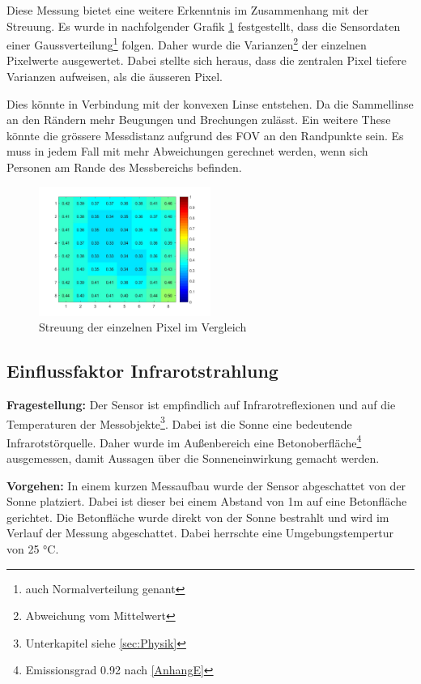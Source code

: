 Diese Messung bietet eine weitere Erkenntnis im Zusammenhang mit der Streuung. Es wurde in nachfolgender Grafik \ref{fig:Streuung} festgestellt, dass die Sensordaten einer Gaussverteilung\footnote[13]{auch Normalverteilung genant} folgen. Daher wurde die Varianzen\footnote[14]{Abweichung vom Mittelwert} der einzelnen Pixelwerte ausgewertet. Dabei stellte sich heraus, dass die zentralen Pixel tiefere Varianzen aufweisen, als die äusseren Pixel.

Dies könnte in Verbindung mit der konvexen Linse entstehen. Da die Sammellinse an den Rändern mehr Beugungen und Brechungen zulässt. Ein weitere These könnte die grössere Messdistanz aufgrund des \ac{FOV} an den Randpunkte sein. Es muss in jedem Fall mit mehr Abweichungen gerechnet werden, wenn sich Personen am Rande des Messbereichs befinden.

\begin{figure}[H]
	\centering
	\includegraphics[width=0.5\textwidth]
	{fig/Distanz_140cm_std_.jpg}
	\caption[Streuung der einzelnen Pixel im Vergleich]{Streuung der einzelnen Pixel im Vergleich}
	\label{fig:Streuung}
\end{figure}

\subsection{Einflussfaktor Infrarotstrahlung}

\textbf{Fragestellung:} Der Sensor ist empfindlich auf Infrarotreflexionen und auf die Temperaturen der Messobjekte\footnote{ Unterkapitel siehe \ref{sec:Physik}}. Dabei ist die Sonne eine bedeutende Infrarotstörquelle. Daher wurde im Außenbereich eine Betonoberfläche\footnote[15]{Emissionsgrad 0.92 nach \ref{AnhangE}} ausgemessen, damit Aussagen über die Sonneneinwirkung gemacht werden. 

\textbf{Vorgehen:} In einem kurzen Messaufbau wurde der Sensor abgeschattet von der Sonne platziert. Dabei ist dieser bei einem Abstand von 1m auf eine Betonfläche gerichtet. Die Betonfläche wurde direkt von der Sonne bestrahlt und wird im Verlauf der Messung abgeschattet. Dabei herrschte eine Umgebungstempertur von 25 °C.  



